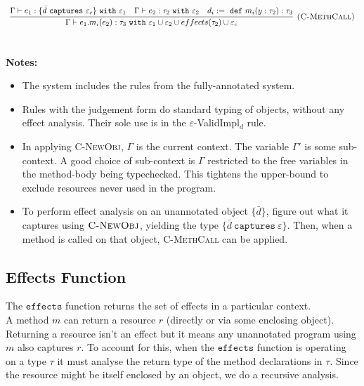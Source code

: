 \documentclass{llncs}
\newcommand{\keywadj}[1]{\mathtt{#1}}
\newcommand{\keyw}[1]{\keywadj{#1}~}
\begin{document}
\[
\begin{array}{c}
\infer[\textsc{(C-MethCall)}]
	{\Gamma \vdash e_1.m_i(e_2) : \tau_3~ \keyw{with} \varepsilon_1 \cup \varepsilon_2 \cup effects(\tau_2) \cup \varepsilon_c}
	{\Gamma \vdash e_1 : \{ \bar d~\keyw{captures} \varepsilon_c \}~\keyw{with} \varepsilon_1 & \Gamma \vdash e_2:\tau_2~\keyw{with} \varepsilon_2&d_i :=~\keyw{def} m_i(y:\tau_2):\tau_3 } \\[5ex]
\end{array}
\]


\noindent \textbf{Notes:}

\begin{itemize}
	\item The system includes the rules from the fully-annotated system.
	\item Rules with the judgement form do standard typing of objects, without any effect analysis. Their sole use is in the $\varepsilon$-ValidImpl$_d$ rule.
	\item In applying \textsc{C-NewObj}, $\Gamma$ is the current context. The variable $\Gamma'$ is some sub-context. A good choice of sub-context is $\Gamma$ restricted to the free variables in the method-body being typechecked. This tightens the upper-bound to exclude resources never used in the program.
	\item To perform effect analysis on an unannotated object $\{ \bar d \}$, figure out what it captures using $\textsc{C-NewObj}$, yielding the type $\{ \bar d~\keyw{captures} \varepsilon \}$. Then, when a method is called on that object, \textsc{C-MethCall} can be applied.
\end{itemize}

\subsection{Effects Function}

\noindent
The $\keywadj{effects}$ function returns the set of effects in a particular context. \\

\noindent
A method $m$ can return a resource $r$ (directly or via some enclosing object). Returning a resource isn't an effect but it means any unannotated program using $m$ also captures $r$. To account for this, when the $\keywadj{effects}$ function is operating on a type $\tau$ it must analyse the return type of the method declarations in $\tau$. Since the resource might be itself enclosed by an object, we do a recursive analysis.
\end{document}
